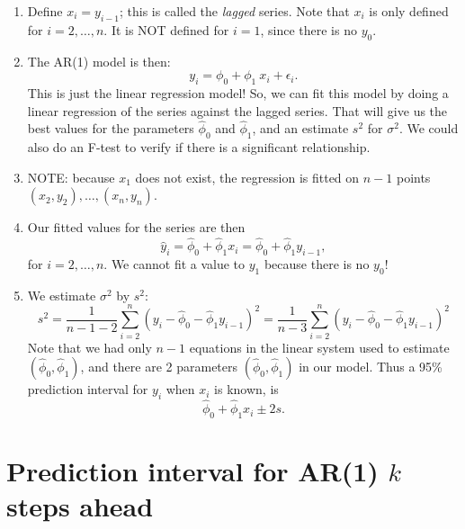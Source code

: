 \documentclass[a4paper,11pt,oneside,onecolumn]{book}
\begin{document}
\begin{enumerate}
\item Define $x_i = y_{i-1}$; this is
called the {\it lagged} series. Note that $x_i$ is only defined for
$i =2,\ldots,n$. It is NOT defined for $i=1$, since there is no
$y_0$.

\item The AR(1) model is then:
\[ y_i = \phi_0 + \phi_1 \ x_i + \epsilon_i. \]
This is just the linear regression model! So, we can fit this
model by doing a linear regression of the series against the
lagged series. That will give us the best values for the
parameters $\hat{\phi}_0$ and $\hat{\phi}_1$, and an estimate
$s^2$ for $\sigma^2$. We could also do an F-test to verify if there is a
significant relationship.

\item NOTE: because $x_1$ does not exist, the regression is fitted on
$n-1$ points $(x_2,y_2),\ldots,(x_n,y_n)$.

\item Our fitted values for the series are then
\[ \hat{y}_i = \hat{\phi}_0 + \hat{\phi}_1 x_i = \hat{\phi}_0 + \hat{\phi}_1
y_{i-1}, \] for $i =2,\ldots,n$. We cannot fit a value to $y_1$
because there is no $y_0$! 

\item We estimate $\sigma^2$ by $s^2$:
$$
s^2= \frac{1}{n-1-2} \sum_{i=2}^n (y_i- \hat{\phi}_0 - \hat{\phi}_1 y_{i-1} )^2 =\frac{1}{n-3} \sum_{i=2}^n (y_i- \hat{\phi}_0 - \hat{\phi}_1 y_{i-1} )^2
$$
Note that we had only $n-1$ equations in the linear system used to  estimate $(\hat{\phi}_0,\hat{\phi}_1)$, and there are  2 parameters $(\hat{\phi}_0,\hat{\phi}_1)$ in our model.
 Thus a
95\% prediction interval for $y_i$ when $x_i$ is known, is
\[ \hat{\phi}_0 + \hat{\phi}_1
x_i 
\pm 2 s. \]
\end{enumerate}


\section{Prediction interval for AR(1) $k$ steps ahead}
\end{document}
